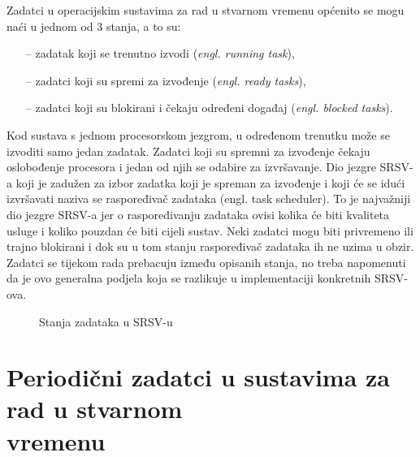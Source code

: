 \documentclass[../zavrsni.tex]{subfiles}
\begin{document}
Zadatci u operacijskim sustavima za rad u stvarnom vremenu općenito se mogu naći u jednom od 3 stanja, a to su:
\begin{itemize}
    \item[--] zadatak koji se trenutno izvodi (\textit{engl. running task}),
    \item[--] zadatci koji su spremi za izvođenje (\textit{engl. ready tasks}),
    \item[--] zadatci koji su blokirani i čekaju određeni događaj (\textit{engl. blocked tasks}).
\end{itemize}

Kod sustava s jednom procesorskom jezgrom, u određenom trenutku može se izvoditi samo jedan zadatak.
Zadatci koji su spremni za izvođenje
čekaju oslobođenje procesora i jedan od njih se odabire za izvršavanje.
Dio jezgre SRSV-a koji je zadužen za izbor zadatka koji je spreman za izvođenje i koji će se idući izvršavati naziva se raspoređivač 
zadataka (engl. task scheduler). To je najvažniji dio jezgre SRSV-a jer o raspoređivanju zadataka ovisi kolika će biti kvaliteta usluge i
koliko pouzdan će biti cijeli sustav.
Neki zadatci mogu biti privremeno ili trajno blokirani i dok su u tom stanju raspoređivač zadataka ih ne uzima u obzir.
Zadatci se tijekom rada prebacuju između opisanih stanja, no treba napomenuti da je ovo generalna podjela koja se razlikuje u 
implementaciji konkretnih SRSV-ova.

\begin{figure}[!htb]
    \caption{\label{fig:my-label} Stanja zadataka u SRSV-u}
  \end{figure}

\section{Periodični zadatci u sustavima za rad u stvarnom \\vremenu}
\end{document}
